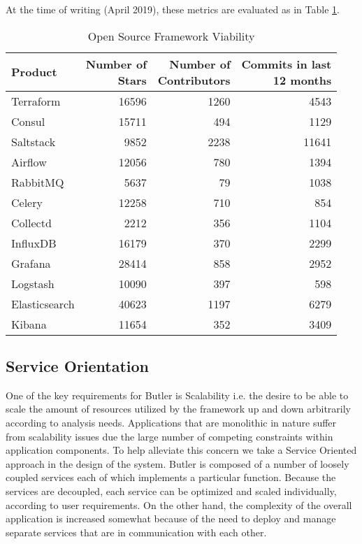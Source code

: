 At the time of writing (April 2019), these metrics are evaluated as in Table \ref{tab:open_source_framework_viability}.

\begin{table}[]
\label{tab:open_source_framework_viability}
\renewcommand{\arraystretch}{1.2} 
\centering
\caption{Open Source Framework Viability}
\begin{tabular}{@{}lrrr@{}}
\toprule
Product & \pbox{5cm}{Number of\\ Stars} & \pbox{5cm}{Number of\\ Contributors} & \pbox{5cm}{Commits in last\\ 12 months}\\
\midrule
Terraform & 16596 & 1260 & 4543 \\
Consul & 15711 & 494 & 1129\\
Saltstack & 9852 & 2238 & 11641 \\
Airflow & 12056 & 780 & 1394\\
RabbitMQ  & 5637 & 79 & 1038\\
Celery & 12258 & 710 & 854\\
Collectd  & 2212 & 356 & 1104\\
InfluxDB & 16179 & 370 & 2299\\
Grafana  & 28414 & 858 & 2952\\
Logstash & 10090 & 397 & 598\\
Elasticsearch & 40623 & 1197 & 6279\\
Kibana  & 11654 & 352 & 3409\\
\bottomrule
\end{tabular}
\end{table}

\subsection {Service Orientation}

One of the key requirements for Butler is Scalability i.e. the desire to be able to scale the amount of resources utilized by the framework up and down arbitrarily according to analysis needs. Applications that are monolithic in nature suffer from scalability issues due the large number of competing constraints within application components. To help alleviate this concern we take a Service Oriented approach in the design of the system. Butler is composed of a number of loosely coupled services each of which implements a particular function. Because the services are decoupled, each service can be optimized and scaled individually, according to user requirements. On the other hand, the complexity of the overall application is increased somewhat because of the need to deploy and manage separate services that are in communication with each other.

